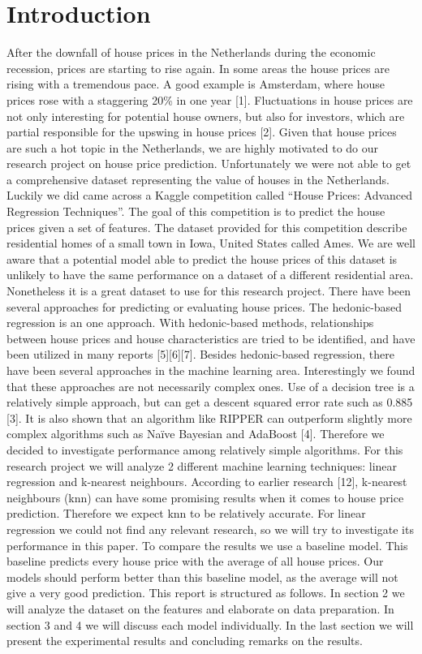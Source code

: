 \documentclass[a4paper,11pt]{article}
\begin{document}
\section{Introduction}
After the downfall of house prices in the Netherlands during the economic recession, prices are starting to rise again. In some areas the house prices are rising with a tremendous pace. A good example is Amsterdam, where house prices rose with a staggering 20\% in one year [1]. Fluctuations in house prices are not only interesting for potential house owners, but also for investors, which are partial responsible for the upswing in house prices [2]. Given that house prices are such a hot topic in the Netherlands, we are highly motivated to do our research project on house price prediction.
    Unfortunately we were not able to get a comprehensive dataset representing the value of houses in the Netherlands. Luckily we did came across a Kaggle competition called “House Prices: Advanced Regression Techniques”. The goal of this competition is to predict the house prices given a set of features. The dataset provided for this competition describe residential homes of a small town in Iowa, United States called Ames. We are well aware that a potential model able to predict the house prices of this dataset is unlikely to have the same performance on a dataset of a different residential area. Nonetheless it is a great dataset to use for this research project.
    There have been several approaches for predicting or evaluating house prices. The hedonic-based regression is an one approach. With hedonic-based methods, relationships between house prices and house characteristics are tried to be identified, and have been utilized in many reports [5][6][7].  Besides hedonic-based regression, there have been several approaches in the machine learning area. Interestingly we found that these approaches are not necessarily complex ones. Use of a decision tree is a relatively simple approach, but can get a descent squared error rate such as 0.885 [3]. It is also shown that an algorithm like RIPPER can outperform slightly more complex algorithms such as Naïve Bayesian and AdaBoost [4]. Therefore we decided to investigate performance among relatively simple algorithms. 
For this research project we will analyze 2 different machine learning techniques: linear regression and k-nearest neighbours. According to earlier research [12],  k-nearest neighbours (knn) can have some promising results when it comes to house price prediction. Therefore we expect knn to be relatively accurate. For linear regression we could not find any relevant research, so we will try to investigate its performance in this paper. To compare the results we use a baseline model. This baseline predicts every house price with the average of all house prices. Our models should perform better than this baseline model, as the average will not give a very good prediction. 
This report is structured as follows. In section 2 we will analyze the dataset on the features and elaborate on data preparation. In section 3 and 4 we will discuss each model individually. In the last section we will present the experimental results and concluding remarks on the results. 
\end{document}
